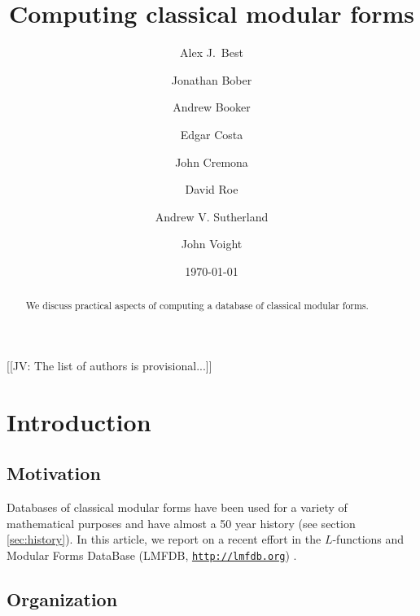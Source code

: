 \documentclass[11pt]{amsart}
\numberwithin{equation}{subsection}
\theoremstyle{plain}
\theoremstyle{definition}
\newcommand{\jv}[1]{{\color{red} \textsf{[[JV: #1]]}}}
\begin{document}
\title{Computing classical modular forms}
\author{Alex J.\ Best}
\address{}
\email{}
\urladdr{}

\author{Jonathan Bober}
\address{}
\email{}
\urladdr{}

\author{Andrew Booker}
\address{}
\email{}
\urladdr{}

\author{Edgar Costa}
\address{}
\email{}
\urladdr{}

\author{John Cremona}
\address{}
\email{}
\urladdr{}

\author{David Roe}
\address{}
\email{}
\urladdr{}

\author{Andrew V. Sutherland}
\address{}
\email{}
\urladdr{}

\author{John Voight}
\address{Department of Mathematics, Dartmouth College, 6188 Kemeny Hall, Hanover, NH 03755, USA}

\date{\today}


\begin{abstract}
We discuss practical aspects of computing a database of classical modular forms.
\end{abstract}

\maketitle
\tableofcontents

\jv{The list of authors is provisional...}

\section{Introduction}

\subsection{Motivation}

Databases of classical modular forms have been used for a variety of mathematical purposes and have almost a 50 year history (see section \ref{sec:history}).  In this article, we report on a recent effort in the $L$-functions and Modular Forms DataBase (LMFDB, \href{http://lmfdb.org}{\texttt{http://lmfdb.org}}) \cite{LMFDB:Cremona}.

\subsection{Organization}
\end{document}
